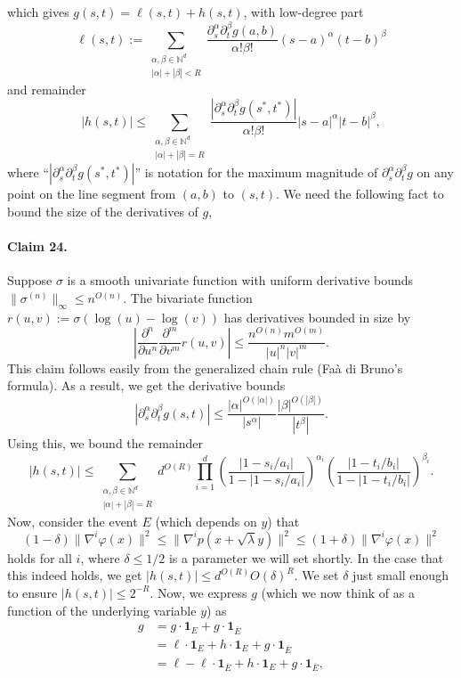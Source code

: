 which gives $g(s,t)=\ell(s,t)+h(s,t)$, with low-degree part
\[\ell(s,t):=\sum_{\substack{\alpha,\beta\in\mathbb N^d\\|\alpha|+|\beta|<R}}\frac{\partial_s^\alpha\partial_t^\beta g(a,b)}{\alpha!\beta!}(s-a)^\alpha(t-b)^\beta\]
and remainder
\[|h(s,t)|\leq\sum_{\substack{\alpha,\beta\in\mathbb N^d\\|\alpha|+|\beta|=R}}\frac{|\partial_s^\alpha\partial_t^\beta g(s^*,t^*)|}{\alpha!\beta!}|s-a|^\alpha|t-b|^\beta,\]
where ``$|\partial_s^\alpha\partial_t^\beta g(s^*,t^*)|$'' is notation for the maximum magnitude of $\partial_s^\alpha\partial_t^\beta g$ on any point on the line segment from $(a,b)$ to $(s,t)$. We need the following fact to bound the size of the derivatives of $g$,
\paragraph{Claim 24.} Suppose $\sigma$ is a smooth univariate function with uniform derivative bounds $\|\sigma^{(n)}\|_\infty\leq n^{O(n)}$. The bivariate function $r(u,v):=\sigma(\log(u)-\log(v))$ has derivatives bounded in size by
\[\left|\frac{\partial^n}{\partial u^n}\frac{\partial^m}{\partial v^m}r(u,v)\right|\leq\frac{n^{O(n)}m^{O(m)}}{|u|^n|v|^m}.\]
This claim follows easily from the generalized chain rule (Faà di Bruno's formula). As a result, we get the derivative bounds
\[|\partial_s^\alpha\partial_t^\beta g(s,t)|\leq\frac{|\alpha|^{O(|\alpha|)}}{|s^\alpha|}\frac{|\beta|^{O(|\beta|)}}{|t^\beta|}.\]
Using this, we bound the remainder
\[|h(s,t)|\leq\sum_{\substack{\alpha,\beta\in\mathbb N^d\\|\alpha|+|\beta|=R}}d^{O(R)}\prod_{i=1}^d\left(\frac{|1-s_i/a_i|}{1-|1-s_i/a_i|}\right)^{\alpha_i}\left(\frac{|1-t_i/b_i|}{1-|1-t_i/b_i|}\right)^{\beta_i}.\]
Now, consider the event $E$ (which depends on $y$) that
\[(1-\delta)\|\nabla^i\varphi(x)\|^2\leq\|\nabla^ip(x+\sqrt\lambda y)\|^2\leq(1+\delta)\|\nabla^i\varphi(x)\|^2\]
holds for all $i$, where $\delta\leq1/2$ is a parameter we will set shortly. In the case that this indeed holds, we get $|h(s,t)|\leq d^{O(R)}O(\delta)^R$.
We set $\delta$ just small enough to ensure $|h(s,t)|\leq2^{-R}$.
Now, we express $g$ (which we now think of as a function of the underlying variable $y$) as
\begin{align*}
g&=g\cdot\boldsymbol1_E+g\cdot\boldsymbol1_{\overline E}\\
&=\ell\cdot\boldsymbol1_E+h\cdot\boldsymbol1_E+g\cdot\boldsymbol1_{\overline E}\\
&=\ell-\ell\cdot\boldsymbol1_{\overline E}+h\cdot\boldsymbol1_E+g\cdot\boldsymbol1_{\overline E},
\end{align*}
